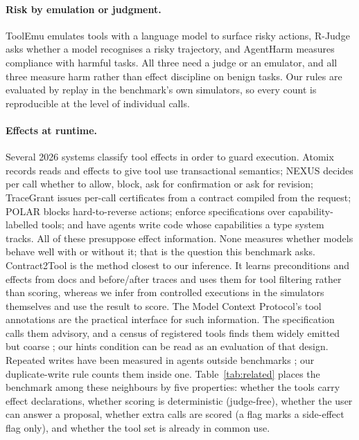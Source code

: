 \documentclass{article}
\begin{document}
\paragraph{Risk by emulation or judgment.} ToolEmu \citep{ruan2024toolemu} emulates tools with a language model to
surface risky actions, R-Judge \citep{yuan2024rjudge} asks whether a model recognises a risky trajectory, and AgentHarm
\citep{andriushchenko2025agentharm} measures compliance with harmful tasks. All three need a judge or an emulator, and
all three measure harm rather than effect discipline on benign tasks. Our rules are evaluated by replay in the
benchmark's own simulators, so every count is reproducible at the level of individual calls.

\paragraph{Effects at runtime.} Several 2026 systems classify tool effects in order to guard execution. Atomix
\citep{mohammadi2026atomix} records reads and effects to give tool use transactional semantics; NEXUS \citep{nexus2026}
decides per call whether to allow, block, ask for confirmation or ask for revision; TraceGrant \citep{tracegrant2026}
issues per-call certificates from a contract compiled from the request; POLAR \citep{kang2026polar} blocks
hard-to-reverse actions; \citet{doshi2026verifiably} enforce specifications over capability-labelled tools; and
\citet{odersky2026capabilities} have agents write code whose capabilities a type system tracks. All of these presuppose
effect information. None measures whether models behave well with or without it; that is the question this benchmark
asks. Contract2Tool \citep{contract2tool2026} is the method closest to our inference. It learns preconditions and
effects from docs and before/after traces and uses them for tool filtering rather than scoring, whereas we infer from
controlled executions in the simulators themselves and use the result to score. The Model Context Protocol's tool
annotations \citep{mcp2025annotations} are the practical interface for such information. The specification calls them
advisory, and a census of registered tools finds them widely emitted but coarse \citep{trofimov2026boundary}; our hints
condition can be read as an evaluation of that design. Repeated writes have been measured in agents outside benchmarks
\citep{li2026exactlyonce}; our duplicate-write rule counts them inside one. Table~\ref{tab:related} places the benchmark
among these neighbours by five properties: whether the tools carry effect declarations, whether scoring is deterministic
(judge-free), whether the user can answer a proposal, whether extra calls are scored (a flag marks a side-effect flag
only), and whether the tool set is already in common use.
\end{document}
